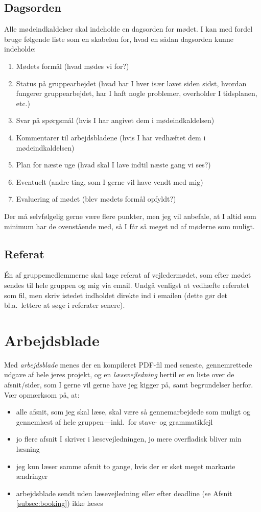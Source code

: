 \documentclass[12pt,a4paper,oneside,final]{article}
\begin{document}
\subsection{Dagsorden}
Alle mødeindkaldelser skal indeholde en dagsorden for mødet.
I kan med fordel bruge følgende liste som en skabelon for, hvad en sådan dagsorden kunne indeholde:
\begin{enumerate}[itemsep=0pt]
\item Mødets formål (hvad mødes vi for?)
\item Status på gruppearbejdet (hvad har I hver især lavet siden sidst, hvordan fungerer gruppearbejdet, har I haft nogle problemer, overholder I tidsplanen, etc.)
\item Svar på spørgsmål (hvis I har angivet dem i mødeindkaldelsen)
\item Kommentarer til arbejdsbladene (hvis I har vedhæftet dem i mødeindkaldelsen)
\item Plan for næste uge (hvad skal I lave indtil næste gang vi ses?)
\item Eventuelt (andre ting, som I gerne vil have vendt med mig)
\item Evaluering af mødet (blev mødets formål opfyldt?)
\end{enumerate}
Der må selvfølgelig gerne være flere punkter, men jeg vil anbefale, at I altid som minimum har de ovenstående med, så I får så meget ud af møderne som muligt.

\subsection{Referat}
\'En af gruppemedlemmerne skal tage referat af vejledermødet, som efter mødet sendes til hele gruppen og mig via email.
Undgå venligst at vedhæfte referatet som fil, men skriv istedet indholdet direkte ind i emailen (dette gør det bl.a.\ lettere at søge i referater senere).


\clearpage
\section{Arbejdsblade}
\label{sec:arbejdsblade}
Med \emph{arbejdsblade} menes der en kompileret PDF-fil med seneste, gennemrettede udgave af hele jeres projekt, og en \emph{læsevejledning} hertil er en liste over de afsnit/sider, som I gerne vil gerne have jeg kigger på, samt begrundelser herfor.
Vær opmærksom på, at:
\begin{itemize}
\item alle afsnit, som jeg skal læse, skal være så gennemarbejdede som muligt og gennemlæst af hele gruppen---inkl.\ for stave- og grammatikfejl
\item jo flere afsnit I skriver i læsevejledningen, jo mere overfladisk bliver min læsning
\item jeg kun læser samme afsnit to gange, hvis der er sket meget markante ændringer
\item arbejdsblade sendt uden læsevejledning eller efter deadline (se Afsnit \ref{subsec:booking}) ikke læses
\end{itemize}
\end{document}

